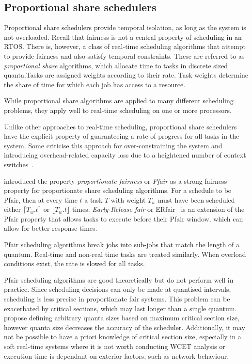 \subsection{Proportional share schedulers}

Proportional share schedulers provide temporal isolation, as long as the system is not overloaded.
Recall that fairness is not a central property of scheduling in an \gls{RTOS}. There is, however, a class of real-time scheduling algorithms that attempt to provide fairness and also satisfy temporal constraints.
These are referred to as \emph{proportional share} algorithms, which allocate time to tasks in discrete sized quanta.Tasks are assigned weights according to their rate.
Task weights determine the share of time for which each job has access to a resource.

While proportional share algorithms are applied to many different scheduling problems, they apply well to real-time scheduling on one or more processors.

Unlike other approaches to real-time scheduling, proportional share schedulers have the explicit property of guaranteeing a rate of progress for all tasks in the system.
Some criticise this approach for over-constraining the system and introducing overhead-related capacity loss due to a heightened number of context switches~\citep{Abeni_Buttazzo_04}.

\citet{Baruah_CPV_96} introduced the property \emph{proportionate fairness} or \emph{Pfair} as a strong fairness property for proportionate share scheduling algorithms.
For a schedule to be Pfair, then at every time $t$ a task $T$ with weight $T_{w}$ must have been scheduled either $\lceil T_{w} . t \rceil$ or $\lfloor T_{w}.t \rfloor $ times.
\emph{Early-Release fair} or ERfair~\citep{Anderson_Srinivasan_04} is an extension of the Pfair property that allows tasks to execute before their Pfair window, which can allow for better response times.

Pfair scheduling algorithms break jobs into sub-jobs that match the length of a quantum.
Real-time and non-real time tasks are treated similarly.
When overload conditions exist, the rate is slowed for all tasks.

Pfair scheduling algorithms are good theoretically but do not perform well in practice.
Since scheduling decisions can only be made at quantised intervals, scheduling is less precise in proportionate fair systems.
This problem can be exacerbated by critical sections, which may last longer than a single quantum.
\citet{Stoica_AKBGP_96} propose defining arbitrary quanta sizes based on maximum critical section size, however quanta size decreases the accuracy of the scheduler.
Additionally, it may not be possible to have a priori knowledge of critical section size, especially in a soft real-time systems where it is not worth conducting \gls{WCET} analysis or execution time is dependant on exterior factors, such as network behaviour.

